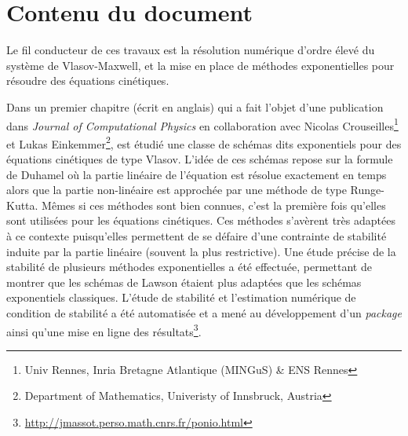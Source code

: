 
\section{Contenu du document}

Le fil conducteur de ces travaux est la résolution numérique d'ordre élevé du système de Vlasov-Maxwell, et la mise en place de méthodes exponentielles pour résoudre des équations cinétiques.

Dans un premier chapitre (écrit en anglais) qui a fait l'objet d'une publication dans \emph{Journal of Computational Physics} en collaboration avec Nicolas Crouseilles\footnote{Univ Rennes, Inria Bretagne Atlantique (MINGuS) \& ENS Rennes} et Lukas Einkemmer\footnote{Department of Mathematics, Univeristy of Innsbruck, Austria}, est étudié une classe de schémas dits exponentiels pour des équations cinétiques de type Vlasov. L'idée de ces schémas repose sur la formule de Duhamel où la partie linéaire de l'équation est résolue exactement en temps alors que la partie non-linéaire est approchée par une méthode de type Runge-Kutta. Mêmes si ces méthodes sont bien connues, c'est la première fois qu'elles sont utilisées pour les équations cinétiques. Ces méthodes s'avèrent très adaptées à ce contexte puisqu'elles permettent de se défaire d'une contrainte de stabilité induite par la partie linéaire (souvent la plus restrictive). Une étude précise de la stabilité de plusieurs méthodes exponentielles a été effectuée, permettant de montrer que les schémas de Lawson étaient plus adaptées que les schémas exponentiels classiques. L'étude de stabilité et l'estimation numérique de condition de stabilité a été automatisée et a mené au développement d'un \emph{package} \Python{} ainsi qu'une mise en ligne des résultats\footnote{\url{http://jmassot.perso.math.cnrs.fr/ponio.html}}.

